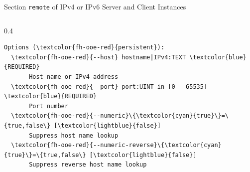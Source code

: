 \begin{frame}[fragile]{Section \alert{\lstinline|remote|} of IPv4 or IPv6 Server and Client Instances}
\begin{columns}[T]
\begin{column}{0.4\textwidth}
\begin{scriptsize}
\begin{Verbatim}[commandchars=\\\{\},frame=leftline,rulecolor=\color{fh-ooe-red}]
Options (\textcolor{fh-ooe-red}{persistent}):
  \textcolor{fh-ooe-red}{--host} hostname|IPv4:TEXT \textcolor{blue}{REQUIRED}
       Host name or IPv4 address
  \textcolor{fh-ooe-red}{--port} port:UINT in [0 - 65535] \textcolor{blue}{REQUIRED}
       Port number
  \textcolor{fh-ooe-red}{--numeric}\{\textcolor{cyan}{true}\}=\{true,false\} [\textcolor{lightblue}{false}]
       Suppress host name lookup
  \textcolor{fh-ooe-red}{--numeric-reverse}\{\textcolor{cyan}{true}\}=\{true,false\} [\textcolor{lightblue}{false}]
       Suppress reverse host name lookup
\end{Verbatim}
\end{scriptsize}
\end{column}
\end{columns}
\end{frame}
